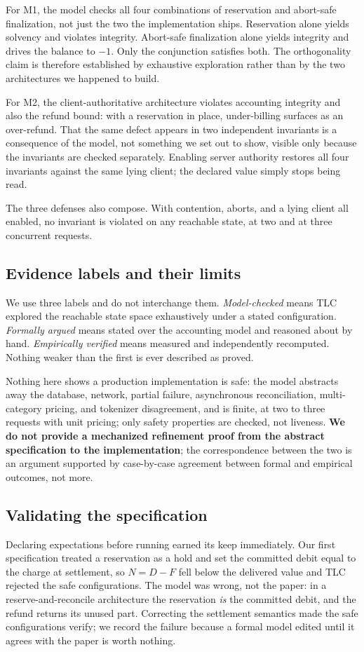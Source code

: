\documentclass[final,5p,times,twocolumn,number]{elsarticle}
\begin{document}
For M1, the model checks all four combinations of reservation and abort-safe
finalization, not just the two the implementation ships. Reservation alone yields
solvency and violates integrity. Abort-safe finalization alone yields integrity and
drives the balance to $-1$. Only the conjunction satisfies both. The orthogonality claim
is therefore established by exhaustive exploration rather than by the two architectures
we happened to build.

For M2, the client-authoritative architecture violates accounting integrity and also the
refund bound: with a reservation in place, under-billing surfaces as an over-refund. That
the same defect appears in two independent invariants is a consequence of the model, not
something we set out to show, visible only because the invariants are checked
separately. Enabling server authority restores all four invariants
against the same lying client; the declared value simply stops being read.

The three defenses also compose. With contention, aborts, and a lying client all enabled,
no invariant is violated on any reachable state, at two and at three concurrent requests.

\subsection{Evidence labels and their limits}
We use three labels and do not interchange them. \emph{Model-checked} means TLC explored
the reachable state space exhaustively under a stated configuration. \emph{Formally
argued} means stated over the accounting model and reasoned about by hand.
\emph{Empirically verified} means measured and independently recomputed. Nothing weaker
than the first is ever described as proved.

Nothing here shows a production implementation is safe: the model abstracts away the
database, network, partial failure, asynchronous reconciliation, multi-category pricing,
and tokenizer disagreement, and is finite, at two to three requests with unit pricing;
only safety properties are checked, not liveness. \textbf{We
do not provide a mechanized refinement proof from the abstract specification to the
implementation}; the correspondence between the two is an argument supported by
case-by-case agreement between formal and empirical outcomes, not more.

\subsection{Validating the specification}
Declaring expectations before running earned its keep immediately. Our first
specification treated a reservation as a hold and set the committed debit equal to the
charge at settlement, so $N = D - F$ fell below the delivered value and TLC rejected the
safe configurations. The model was wrong, not the paper: in a reserve-and-reconcile
architecture the reservation \emph{is} the committed debit, and the refund returns its
unused part. Correcting the settlement semantics made the safe configurations verify; we record the
failure because a formal model edited until it agrees with the paper is worth nothing.
\end{document}
